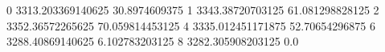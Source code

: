 0 3313.203369140625 30.8974609375
1 3343.38720703125 61.081298828125
2 3352.36572265625 70.059814453125
4 3335.012451171875 52.70654296875
6 3288.40869140625 6.102783203125
8 3282.305908203125 0.0
